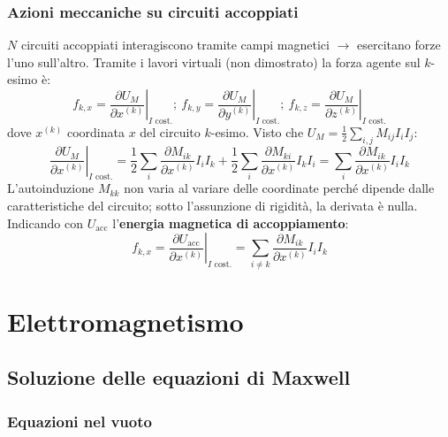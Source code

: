 \documentclass[a4paper]{scrartcl}
\newcommand*\Eval[3]{\left.#1\right\rvert_{#2}^{#3}}
\numberwithin{equation}{subsection}
\theoremstyle{style1}
\begin{document}
\subsubsection{Azioni meccaniche su circuiti accoppiati}

$N$ circuiti accoppiati interagiscono tramite campi magnetici $\to$ esercitano forze l'uno sull'altro. Tramite i lavori virtuali (non dimostrato) la forza agente sul $k$-esimo \`e:
\begin{equation}
	f_{k,x} = \Eval{\frac{\partial U_M}{\partial x^{(k)} } }{I \text{ cost.}}{} ; \ f_{k,y} = \Eval{\frac{\partial U_M}{\partial y^{(k)} } }{I \text{ cost.}}{} ; \ f_{k,z} = \Eval{\frac{\partial U_M}{\partial z^{(k)} } }{I \text{ cost.}}{}
\end{equation}
dove $x^{(k)} $ coordinata $x$ del circuito $k$-esimo. Visto che $U_M = \frac{1}{2}\sum_{i,j}^{} M_{ij} I_i I_j$:
\[
\Eval{\frac{\partial U_M}{\partial x^{(k)} } }{I \text{ cost.}}{} = \frac{1}{2}\sum_{i}^{} \frac{\partial M_{ik} }{\partial x^{(k)} } I_i I_k + \frac{1}{2}\sum_{i}^{} \frac{\partial M_{ki} }{\partial x^{(k)} } I_kI_i= \sum_{i}^{} \frac{\partial M_{ik} }{\partial x^{(k)} } I_iI_k
\] 
L'autoinduzione $M_{kk} $ non varia al variare delle coordinate perch\'e dipende dalle caratteristiche del circuito; sotto l'assunzione di rigidit\`a, la derivata \`e nulla. Indicando con $U_\text{acc}$ l'\textbf{energia magnetica di accoppiamento}:
\begin{equation}
	f_{k,x} = \Eval{\frac{\partial U_\text{acc}}{\partial x^{(k)} } }{I \text{ cost.}}{}=\sum_{i\neq k}^{} \frac{\partial M_{ik} }{\partial x^{(k)} } I_iI_k
\end{equation}

\newpage
\section{Elettromagnetismo}

\subsection{Soluzione delle equazioni di Maxwell}

\subsubsection{Equazioni nel vuoto}
\end{document}

